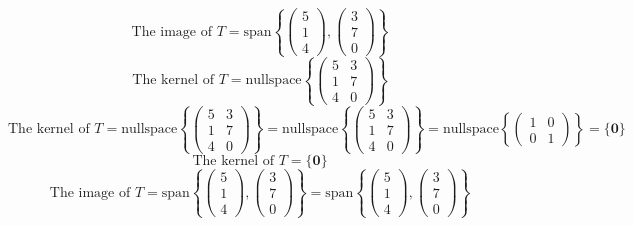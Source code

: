\documentclass[a3paper,12pt]{extarticle} %
\begin{document}
\begin{enumerate}
\begin{enumerate}
\[        \]
        \[
            \text{The image of } T = \text{span}\left\{ \begin{pmatrix} 5 \\ 1 \\ 4 \end{pmatrix}, \begin{pmatrix} 3 \\ 7 \\ 0 \end{pmatrix} \right\}
        \]
        \[
            \text{The kernel of } T = \text{nullspace}\left\{ \begin{pmatrix} 5 & 3 \\ 1 & 7 \\ 4 & 0 \end{pmatrix} \right\}
        \]
        \[
            \text{The kernel of } T = \text{nullspace}\left\{ \begin{pmatrix} 5 & 3 \\ 1 & 7 \\ 4 & 0 \end{pmatrix} \right\} = \text{nullspace}\left\{ \begin{pmatrix} 5 & 3 \\ 1 & 7 \\ 4 & 0 \end{pmatrix} \right\} = \text{nullspace}\left\{ \begin{pmatrix} 1 & 0 \\ 0 & 1 \end{pmatrix} \right\} = \{ \mathbf{0} \}
        \]
        \[
            \text{The kernel of } T = \{ \mathbf{0} \}
        \]
        \[
            \text{The image of } T = \text{span}\left\{ \begin{pmatrix} 5 \\ 1 \\ 4 \end{pmatrix}, \begin{pmatrix} 3 \\ 7 \\ 0 \end{pmatrix} \right\} = \text{span}\left\{ \begin{pmatrix} 5 \\ 1 \\ 4 \end{pmatrix}, \begin{pmatrix} 3 \\ 7 \\ 0 \end{pmatrix} \right\}
        \]
        \[
\]
\end{enumerate}
\end{enumerate}
\end{document}
